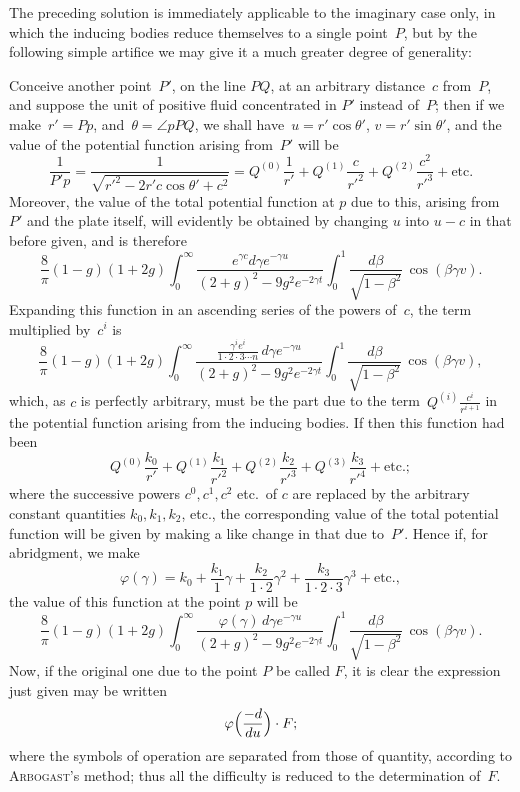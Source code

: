 \documentclass[11pt,notitlepage]{amsart}
\let\Person\textsc
\renewcommand{\phi}{\varphi}
\begin{document}
The preceding solution is immediately applicable to the imaginary case
only, in which the inducing bodies reduce themselves to a single point~$P$,
but by the following simple artifice we may give it a much greater degree
of generality:

Conceive another point~$P'$, on the line $PQ$, at an arbitrary distance~$c$
from~$P$, and suppose the unit of positive fluid concentrated in $P'$
instead of~$P$;
then if we make~$r'=Pp$,
and~$\theta=\angle pPQ$,
we shall have~$u=r'\cos\theta'$, $v=r'\sin\theta'$,
and the value of the potential function arising from~$P'$ will be
\[
\frac{1}{P'p}=
\frac{1}{\sqrt{r'^2-2r'c\cos\theta'+c^2}}
=Q^{(0)}\frac{1}{r'}
+Q^{(1)}\frac{c}{r'^2}
+Q^{(2)}\frac{c^2}{r'^3}
+\text{etc.}
\]
Moreover, the value of the total potential function at $p$ due to this, arising
from~$P'$ and the plate itself, will evidently be obtained by changing $u$ into
$u-c$ in that before given, and is therefore
\[
\frac8\pi(1-g)(1+2g)
\int_0^\infty\frac{e^{\gamma c}d\gamma e^{-\gamma u}}
{(2+g)^2-9g^2e^{-2\gamma t}}
\int_0^1\frac{d\beta}{\sqrt{1-\beta^2}}\,\cos(\beta\gamma v).
\]
Expanding this function in an ascending series of the powers of~$c$, the term
multiplied by~$c^i$ is
\[
\frac8\pi(1-g)(1+2g)
\int_0^\infty\frac
{\frac{\gamma^ie^i}{1\cdot2\cdot3\cdots n}\,d\gamma e^{-\gamma u}}
{(2+g)^2-9g^2e^{-2\gamma t}}
\int_0^1\frac{d\beta}{\sqrt{1-\beta^2}}\,\cos(\beta\gamma v),
\]
which, as $c$ is perfectly arbitrary,
must be the part due to the term~$Q^{(i)}\frac{c^i}{r^{i+1}}$
in the potential function arising from the inducing bodies.
If then this function
had been
\[
Q^{(0)}\frac{k_0}{r'}
+Q^{(1)}\frac{k_1}{r'^2}
+Q^{(2)}\frac{k_2}{r'^3}
+Q^{(3)}\frac{k_3}{r'^4}
+\text{etc.};
\]
where the successive powers $c^0,c^1,c^2$ etc.\ of $c$
are replaced by the arbitrary
constant quantities $k_0,k_1,k_2$, etc.,
the corresponding value of the total potential
function will be given by making a like change in that due to~$P'$.
Hence if,
for abridgment, we make
\[
\phi(\gamma)=
k_0+\frac{k_1}{1}\gamma+\frac{k_2}{1\cdot2}\gamma^2
+\frac{k_3}{1\cdot2\cdot3}\gamma^3+
\text{etc.},
\]
the value of this function at the point $p$ will be
\[
\frac8\pi(1-g)(1+2g)
\int_0^\infty\frac{\phi(\gamma)\,d\gamma e^{-\gamma u}}
{(2+g)^2-9g^2e^{-2\gamma t}}
\int_0^1\frac{d\beta}{\sqrt{1-\beta^2}}\,\cos(\beta\gamma v).
\]
Now, if the original one due to the point $P$ be called $F$, it is clear the
expression just given may be written
\[
\phi\Bigl(\frac{-d}{du}\Bigr)\cdot F;
\]
where the symbols of operation are separated from those of quantity, according
to \Person{Arbogast}'s method;
thus all the difficulty is reduced to the determination of~$F$.
\end{document}

